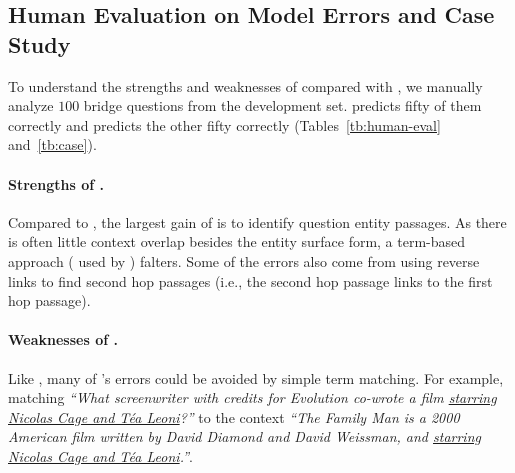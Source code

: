 \subsection{Human Evaluation on Model Errors and Case Study}

To understand the strengths and weaknesses of \name{} compared with
\grr{}, we manually analyze $100$ bridge questions from the \hotpot{}
development set. \name{} predicts fifty of them correctly and \grr{}
predicts the other fifty correctly (Tables~\ref{tb:human-eval} and~\ref{tb:case}).



\paragraph{Strengths of \name{}.}
Compared to \grr{}, the largest gain of \name{} is to identify question entity passages. 
As there is often little context overlap besides the entity surface form, 
a term-based approach ( used by \grr{}) falters.
Some of the \grr{} errors 
also come from using reverse links to find second hop passages (i.e., the second hop passage links to the 
first hop passage). 

\paragraph{Weaknesses of \name{}.}
Like \citet{karpukhin-etal-2020-dense}, many of \name{}'s
errors could be avoided by simple term matching. For example, matching 
\textit{``What screenwriter with credits for Evolution co-wrote a film \ul{starring Nicolas Cage and T\'ea Leoni}?''}
to the context \textit{``The Family Man is a 2000 American film written by David Diamond and David Weissman,
and \ul{starring Nicolas Cage and T\'ea Leoni}.''}.






